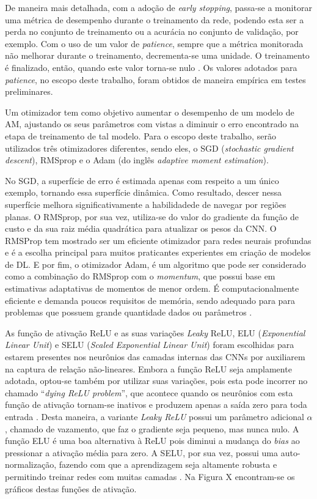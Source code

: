 De maneira mais detalhada, com a adoção de \emph{early stopping}, passa-se a monitorar uma métrica de desempenho durante o treinamento da rede, podendo esta ser a perda no conjunto de treinamento ou a acurácia no conjunto de validação, por exemplo. Com o uso de um valor de \emph{patience}, sempre que a métrica monitorada não melhorar durante o treinamento, decrementa-se uma unidade. O treinamento é finalizado, então, quando este valor torna-se nulo \cite{chollet}. Os valores adotados para \emph{patience}, no escopo deste trabalho, foram obtidos de maneira empírica em testes preliminares.

Um otimizador tem como objetivo aumentar o desempenho de um modelo de AM, ajustando os seus parâmetros com vistas a diminuir o erro encontrado na etapa de treinamento de tal modelo. Para o escopo deste trabalho, serão utilizados três otimizadores diferentes, sendo eles, o SGD (\emph{stochastic gradient descent}), RMSprop e o Adam (do inglês \emph{adaptive moment estimation}).

No SGD, a superfície de erro é estimada apenas com respeito a um único exemplo, tornando essa superfície dinâmica. Como resultado, descer nessa superfície melhora significativamente a habilidadede de navegar por regiões planas. O RMSprop, por sua vez, utiliza-se do valor do gradiente da função de custo e da sua raiz média quadrática para atualizar os pesos da CNN. O RMSProp tem mostrado ser um eficiente otimizador para redes neurais profundas e é a escolha principal para muitos praticantes experientes em criação de modelos de DL. E por fim, o otimizador Adam, é um algoritmo que pode ser considerado como a combinação do RMSprop com o \emph{momentum}, que possui base em estimativas adaptativas de momentos de menor ordem. É computacionalmente eficiente e demanda poucos requisitos de memória, sendo adequado para para problemas que possuem grande quantidade dados ou parâmetros \cite{buduma, rmsprop, adam}.

As função de ativação ReLU e as suas variações \emph{Leaky} ReLU, ELU (\emph{Exponential Linear Unit}) e SELU (\emph{Scaled Exponential Linear Unit}) foram escolhidas para estarem presentes nos neurônios das camadas internas das CNNs por auxiliarem na captura de relação não-lineares. Embora a função ReLU seja amplamente adotada, optou-se também por utilizar suas variações, pois esta pode incorrer no chamado ``\emph{dying ReLU problem}'', que acontece quando os neurônios com esta função de ativação tornam-se inativos e produzem apenas a saída zero para toda entrada \cite{reluDying}.  Desta maneira, a variante \emph{Leaky ReLU} possui um parâmetro adicional $\alpha$, chamado de vazamento, que faz o gradiente seja pequeno, mas nunca nulo. A função ELU é uma boa alternativa à ReLU pois diminui a mudança do \emph{bias} ao pressionar a ativação média para zero. A SELU, por sua vez, possui uma auto-normalização, fazendo com que a aprendizagem seja altamente robusta e permitindo treinar redes com muitas camadas \cite{relu}. Na Figura X encontram-se os gráficos destas funções de ativação.

